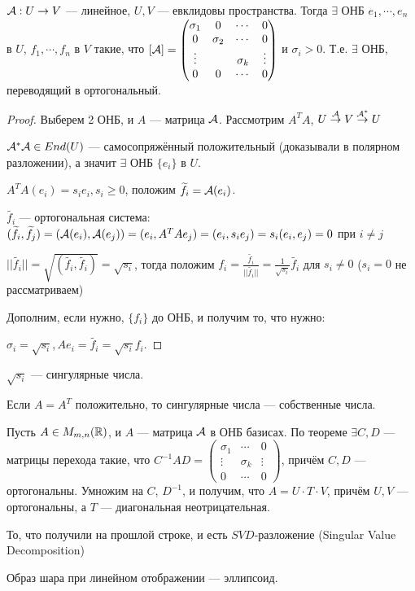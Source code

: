 
\begin{theorem}
    $\mathcal{A} : U \to V$ --- линейное, $U, V$ --- евклидовы пространства. Тогда $\exists$ ОНБ $e_1, \cdots, e_n$ в $U$, $f_1, \cdots , f_n$ в $V$ такие, что $[\mathcal{A}] = \begin{pmatrix} \sigma_1 & 0 & \cdots & 0 \\ 0 & \sigma_2 & \cdots & 0 \\ \vdots & & \sigma_k & \vdots \\ 0 & 0 & \cdots & 0  \end{pmatrix}$ и $\sigma_i > 0$. Т.е. $\exists$ ОНБ, переводящий в ортогональный. 
\end{theorem}
\begin{proof}
	Выберем 2 ОНБ, и $A$ --- матрица $\mathcal{A}$. Рассмотрим $A^T A$, $U \stackrel{\mathcal{A}}{\to} V \stackrel{\mathcal{A}^*}{\to} U$ 

	$\mathcal{A}^* \mathcal{A} \in End(U)$ --- самосопряжённый положительный (доказывали в полярном разложении), а значит $\exists$ ОНБ $\{ e_i \}$ в $U$. 

	$A^T A(e_i) = s_i e_i, s_i \ge 0$, положим $\widetilde{f_i} = \mathcal{A}(e_i)$. 

	$\widetilde{f_i}$ --- ортогональная система: $(\widetilde{f_i}, \widetilde{f_j}) = (\mathcal{A}(e_i), \mathcal{A}(e_j)) = (e_i, A^T A e_j) = (e_i, s_i e_j) = s_i(e_i, e_j) = 0$ при $i \neq j$

	$|| \widetilde{f_i} || = \sqrt{(\widetilde{f_i}, \widetilde{f_i})} = \sqrt{s_i}$, тогда положим $f_i = \frac{\widetilde{f_i}}{|| \widetilde{f_i} ||} = \frac1{\sqrt{s_i}} \widetilde{f_i}$ для $s_i \neq 0$ ($s_i = 0$ не рассматриваем)

	Дополним, если нужно, $\{f_i\}$ до ОНБ, и получим то, что нужно:

	$\sigma_i = \sqrt{s_i}, A e_i = \widetilde{f_i} = \sqrt{s_i} f_i$.
\end{proof}
\begin{definition}
	$\sqrt{s_i}$ --- сингулярные числа.

	Если $A = A^T$ положительно, то сингулярные числа --- собственные числа.
\end{definition}

Пусть $A \in M_{m, n}(\mathbb{R})$, и $A$ --- матрица $\mathcal{A}$ в ОНБ базисах. По теореме $\exists C, D$ --- матрицы перехода такие, что $C^{-1} A D = \begin{pmatrix} \sigma_1 & \cdots & 0 \\ \vdots & \sigma_k & \vdots \\ 0 & \cdots & 0  \end{pmatrix}$, причём $C, D$ --- ортогональны. Умножим на $C$, $D^{-1}$, и получим, что $A = U \cdot T \cdot V$, причём $U, V$ --- ортогональны, а $T$ --- диагональная неотрицательная.

\begin{definition}
    То, что получили на прошлой строке, и есть $SVD$-разложение (Singular Value Decomposition)
\end{definition}
\begin{consequence}
    Образ шара при линейном отображении --- эллипсоид.
\end{consequence}
